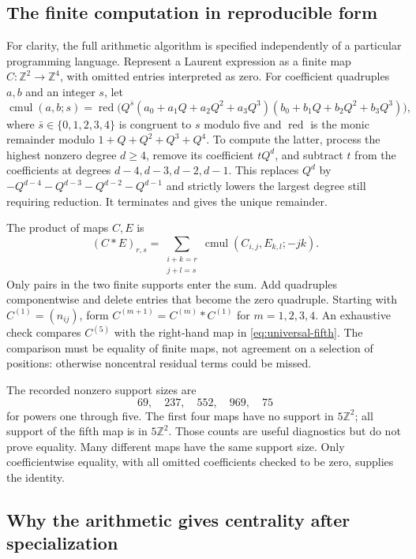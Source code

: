 \documentclass[11pt,letterpaper]{article}
\theoremstyle{definition}
\theoremstyle{remark}
\newcommand{\ZZ}{\mathbb Z}
\newcommand{\red}{\operatorname{red}}
\begin{document}
\subsection{The finite computation in reproducible form}

For clarity, the full arithmetic algorithm is specified independently of
a particular programming language. Represent a Laurent expression as a
finite map $C\colon\ZZ^2\to\ZZ^4$, with omitted entries interpreted as zero.
For coefficient quadruples $a,b$ and an integer $s$, let
\[
\operatorname{cmul}(a,b;s)
 =\red\bigl(Q^{\bar s}(a_0+a_1Q+a_2Q^2+a_3Q^3)
                     (b_0+b_1Q+b_2Q^2+b_3Q^3)\bigr),
\]
where $\bar s\in\{0,1,2,3,4\}$ is congruent to $s$ modulo five and
$\red$ is the monic remainder modulo $1+Q+Q^2+Q^3+Q^4$.
To compute the latter, process the highest nonzero degree $d\geq4$,
remove its coefficient $tQ^d$, and subtract $t$ from the coefficients
at degrees $d-4,d-3,d-2,d-1$. This replaces
$Q^d$ by $-Q^{d-4}-Q^{d-3}-Q^{d-2}-Q^{d-1}$ and strictly lowers the
largest degree still requiring reduction. It terminates and gives the
unique remainder.

The product of maps $C,E$ is
\begin{equation}\label{eq:convolution}
(C\ast E)_{r,s}
 =\sum_{\substack{i+k=r\\j+l=s}}
     \operatorname{cmul}(C_{i,j},E_{k,l};-jk).
\end{equation}
Only pairs in the two finite supports enter the sum. Add quadruples
componentwise and delete entries that become the zero quadruple. Starting
with $C^{(1)}=(n_{ij})$, form
$C^{(m+1)}=C^{(m)}\ast C^{(1)}$ for $m=1,2,3,4$.
An exhaustive check compares $C^{(5)}$ with the right-hand map in
\eqref{eq:universal-fifth}. The comparison must be equality of finite maps,
not agreement on a selection of positions: otherwise noncentral residual
terms could be missed.

The recorded nonzero support sizes are
\[
69,\quad237,\quad552,\quad969,\quad75
\]
for powers one through five. The first four maps have no support in
$5\ZZ^2$; all support of the fifth map is in $5\ZZ^2$. Those counts are
useful diagnostics but do not prove equality. Many different maps have
the same support size. Only coefficientwise equality, with all omitted
coefficients checked to be zero, supplies the identity.

\subsection{Why the arithmetic gives centrality after specialization}
\end{document}
